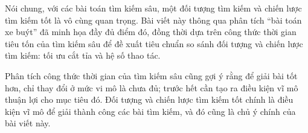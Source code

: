 \documentclass[11pt]{article}
\begin{document}
Nói chung, với các bài toán tìm kiếm sâu, một đối tượng tìm kiếm và chiến
lược tìm kiếm tốt là vô cùng quan trọng. Bài viết này thông qua phân tích
``bài toán xe buýt'' đã minh họa đầy đủ điểm đó, đồng thời dựa trên công thức
thời gian tiêu tốn của tìm kiếm sâu để đề xuất tiêu chuẩn so sánh đối tượng và
chiến lược tìm kiếm: tối ưu cắt tỉa và hệ số thao tác.

Phân tích công thức thời gian của tìm kiếm sâu cũng gợi ý rằng để giải bài tốt
hơn, chỉ thay đổi ở mức vi mô là chưa đủ; trước hết cần tạo ra điều kiện vĩ
mô thuận lợi cho mục tiêu đó. Đối tượng và chiến lược tìm kiếm tốt chính là
điều kiện vĩ mô để giải thành công các bài tìm kiếm, và đó cũng là chủ ý chính
của bài viết này.
\end{document}
